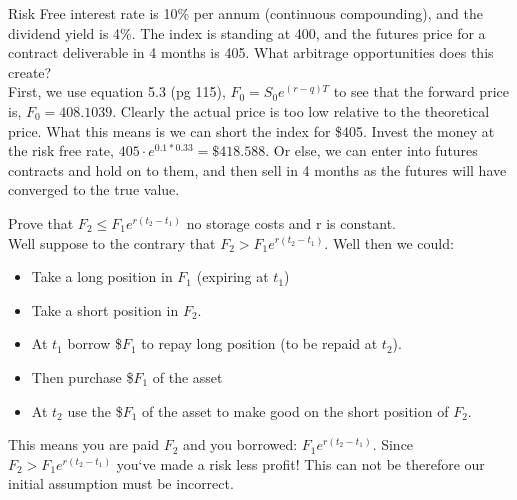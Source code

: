 \documentclass[12pt]{article}
\newenvironment{problem}[3][Problem]{\begin{trivlist}
\item[\hskip \labelsep {\bfseries #1}\hskip \labelsep {\bfseries #2.}]}{\end{trivlist}}
\begin{document}
\begin{problem}{5.12}. Risk Free interest rate is 10\% per annum (continuous compounding), and the dividend yield is 4\%. The index is standing at 400, and the futures price for a contract deliverable in 4 months is 405. What arbitrage opportunities does this create? \\
First, we use equation 5.3 (pg 115), $F_0 = S_0e^{(r-q)T}$ to see that the forward price is, $F_0 = 408.1039$. Clearly the actual price is too low relative to the theoretical price. What this means is we can short the index for \$405. Invest the money at the risk free rate, $405\cdot e^{0.1*0.33} = \$418.588 $. Or else, we can enter into futures contracts and hold on to them, and then sell in 4 months as the futures will have converged to the true value.
\end{problem}

\begin{problem}{5.16}. Prove that $F_2 \leq F_1e^{r(t_2-t_1)}$ no storage costs and r is constant.\\
Well suppose to the contrary that $F_2 > F_1e^{r(t_2-t_1)}$. Well then we could:
\begin{itemize}
\item Take a long position in $F_1$ (expiring at $t_1$) 
\item Take a short position in $F_2$. 
\item At $t_1$ borrow \$$F_1$ to repay long position (to be repaid at $t_2$). 
\item Then purchase \$$F_1$ of the asset 
\item At $t_2$ use the \$$F_1$ of the asset to make good on the short position of $F_2$.
\end{itemize}
This means you are paid $F_2$ and you borrowed: $F_1e^{r(t_2-t_1)}$. Since $F_2>F_1e^{r(t_2-t_1)}$ you`ve made a risk less profit! This can not be therefore our initial assumption must be incorrect. 
\end{problem} 
\end{document}
